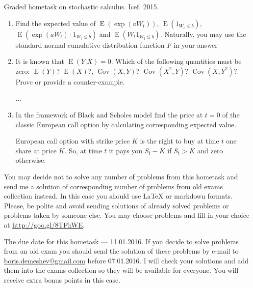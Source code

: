 \documentclass[12pt,a4paper]{article}
\DeclareMathOperator{\Cov}{Cov}
\DeclareMathOperator{\E}{E}
\begin{document}
\pagestyle{empty}
Graded hometask on stochastic calculus. Icef. 2015.


\begin{enumerate}

\item Find the expected value of $\E(\exp(aW_t))$, $\E(1_{W_t\leq b})$, $\E(\exp(aW_t)\cdot 1_{W_t\leq b})$ and $\E(W_t 1_{W_t\leq b})$. Naturally, you may use the standard normal cumulative distribution function $F$ in your answer


\item It is known that $\E(Y|X)=0$. Which of the following quantities must be zero: $\E(Y)$? $\E(X)$?, $\Cov(X,Y)$? $\Cov(X^2,Y)$? $\Cov(X,Y^2)$? Prove or provide a counter-example.


...



\item In the framework of Black and Scholes model find the price at $t=0$ of the classic European сall option by calculating corresponding expected value.

European call option with strike price $K$ is the right to buy at time $t$ one share at price $K$. So, at time $t$ it pays you $S_t - K$ if $S_t > K$ and zero otherwise.

\end{enumerate}

\vspace{2cm}

You may decide not to solve any number of problems from this hometask and send me a solution of corresponding number of problems from old exams collection instead. In this case you should use \LaTeX{} or markdown formats. Please, be polite and avoid sending solutions of already solved problems or problems taken by someone else. You may choose problems and fill in your choice at \url{http://goo.gl/8TFhWE}.

The due date for this hometask --- 11.01.2016. If you decide to solve problems from an old exam you should send the solution of these problems by e-mail to \href{mailto:boris.demeshev@gmail.com}{boris.demeshev@gmail.com} before 07.01.2016. I will check your solutions and add them into the exams collection so they will be available for everyone. You will receive extra bonus points in this case.
\end{document}
